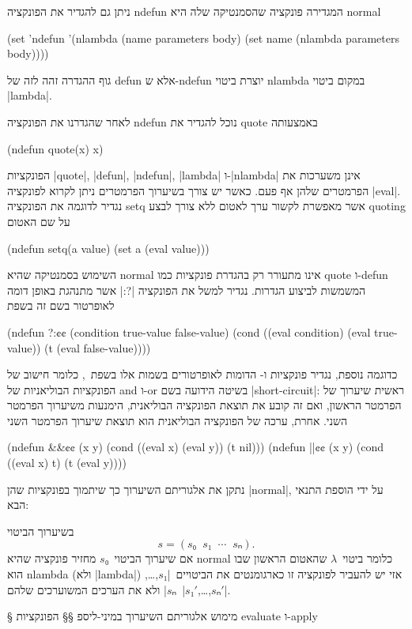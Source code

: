 ניתן גם להגדיר את הפונקציה ndefun המגדירה פונקציה שהסמנטיקה שלה היא normal
\begin{LIBRARY}
(set 'ndefun
  '(nlambda (name parameters body)
    (set name (nlambda parameters body))))
\end{LIBRARY}
גוף ההגדרה זהה לזה של defun אלא ש-ndefun יוצרת ביטוי nlambda במקום ביטוי
\E|lambda|.

לאחר שהגדרנו את הפונקציה ndefun נוכל להגדיר את quote באמצעותה
\begin{LISP}
(ndefun quote(x) x)
\end{LISP}
הפונקציות \E|quote|, \E|defun|, \E|ndefun|, \E|lambda| ו-\E|nlambda| אינן
משערכות את הפרמטרים שלהן אף פעם. כאשר יש צורך בשיערוך הפרמטרים ניתן לקרוא
לפונקציה \E|eval|. נגדיר לדוגמה את הפונקציה setq אשר מאפשרת לקשור ערך לאטום ללא
צורך לבצע quoting על שם האטום
\begin{LISP}
(ndefun setq(a value)
  (set a (eval value)))
\end{LISP}
השימוש בסמנטיקה שהיא normal אינו מתעורר רק בהגדרת פונקציות כמו quote ו-defun
המשמשות לביצוע הגדרות. נגדיר למשל את הפונקציה \T|?:| אשר מתנהגת באופן דומה
לאופרטור בשם זה בשפת~\CPL
\begin{LISP}
(ndefun ?:¢¢ (condition true-value false-value)
  (cond ((eval condition) (eval true-value))
        (t (eval false-value))))
\end{LISP}
כדוגמה נוספת, נגדיר פונקציות \lisp{||} ו-\lisp{&&} הדומות לאופרטורים בשמות אלו
בשפת~\CPL, כלומר חישוב של הפונקציות הבוליאניות של and ו-or בשיטה הידועה בשם
\E|short-circuit|: ראשית שיערוך של הפרמטר הראשון, ואם זה קובע את תוצאת הפונקציה
הבוליאנית, הימנעות משיערוך הפרמטר השני. אחרת, ערכה של הפונקציה הבוליאנית הוא תוצאת
שיערוך הפרמטר השני
\begin{LISP}
(ndefun &&¢¢ (x y)
  (cond ((eval x) (eval y))
        (t nil)))
(ndefun ||¢¢ (x y)
  (cond ((eval x) t)
        (t (eval y))))
\end{LISP}

נתקן את אלגוריתם השיערוך כך שיתמוך בפונקציות שהן \E|normal|, על ידי הוספת התנאי
הבא:
\begin{mdframed}[backgroundcolor=Lavender!20]
  \footnotesize
  בשיערוך הביטוי \[
    s=(s₀\;\;s₁\;\;⋯\;\;sₙ).
\] אם שיערוך הביטוי~$s₀$ מחזיר פונקציה שהיא
  normal כלומר ביטוי~$λ$ שהאטום הראשון שבו הוא nlambda (ולא \E|lambda|) אזי יש
  להעביר לפונקציה זו כארגומנטים את הביטויים~\E|$s₁$,…,$sₙ$| ולא את הערכים
  המשוערכים שלהם~\E|$s₁'$,…,$sₙ'$|.
\end{mdframed}

§ מימוש אלגוריתם השיערוך במיני-ליספ
§§ הפונקציות evaluate ו-apply


